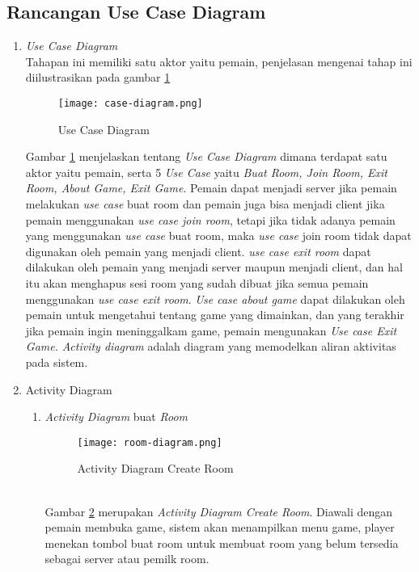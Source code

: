 \subsection{Rancangan Use Case Diagram}
\begin{enumerate}
    \item \textit{Use Case Diagram}
    \\ Tahapan ini memiliki satu aktor yaitu pemain, penjelasan mengenai tahap ini diilustrasikan pada gambar \ref{fig:case-diagram}
    \begin{figure}[h]
        \centering
        \texttt{[image: case-diagram.png]}
        \caption{Use Case Diagram}
        \label{fig:case-diagram}
    \end{figure}
    Gambar \ref{fig:case-diagram} menjelaskan tentang \textit{Use Case Diagram} dimana terdapat satu aktor yaitu pemain, serta 5 \textit{Use Case} yaitu \textit{Buat Room, Join Room, Exit Room, About Game, Exit Game}.
    Pemain dapat menjadi server jika pemain melakukan \textit{use case} buat room dan pemain juga bisa menjadi client jika pemain menggunakan \textit{use case join room}, tetapi jika tidak adanya pemain yang menggunakan \textit{use case} buat room, maka \textit{use case} join room tidak dapat digunakan oleh pemain yang menjadi client.
    \textit{use case exit room} dapat dilakukan oleh pemain yang menjadi server maupun menjadi client, dan hal itu akan menghapus sesi room yang sudah dibuat jika semua pemain menggunakan \textit{use case exit room}. \textit{Use case about game} dapat dilakukan oleh pemain untuk mengetahui tentang game yang dimainkan, dan yang terakhir jika pemain ingin meninggalkam game, pemain mengunakan \textit{Use case Exit Game.}
    \textit{Activity diagram} adalah diagram yang memodelkan aliran aktivitas pada sistem.
    \item Activity Diagram
    \begin{enumerate}
        \item \textit{Activity Diagram} buat \textit{Room}
        \begin{figure}[h]
           \centering
           \texttt{[image: room-diagram.png]}
           \caption{Activity Diagram Create Room}
           \label{fig:croom-case}
       \end{figure}
       \\ Gambar \ref{fig:croom-case} merupakan \textit{Activity Diagram Create Room}. Diawali dengan pemain membuka game, sistem akan menampilkan menu game, player menekan tombol buat room untuk membuat room yang belum tersedia sebagai server atau pemilk room.

\end{enumerate}
\end{enumerate}
